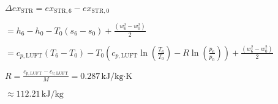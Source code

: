 \( \Delta ex_{\text{STR}} = ex_{\text{STR},6} - ex_{\text{STR},0} \)  

\( = h_6 - h_0 - T_0 \left( s_6 - s_0 \right) + \frac{\left( w_6^2 - w_0^2 \right)}{2} \)  

\( = c_{p,\text{LUFT}} \left( T_6 - T_0 \right) - T_0 \left( c_{p,\text{LUFT}} \ln \left( \frac{T_6}{T_0} \right) - R \ln \left( \frac{p_6}{p_0} \right) \right) + \frac{\left( w_6^2 - w_0^2 \right)}{2} \)  

\( R = \frac{c_{p,\text{LUFT}} - c_{v,\text{LUFT}}}{M} = 0.287 \, \text{kJ/kg·K} \)  

\( \approx 112.21 \, \text{kJ/kg} \)